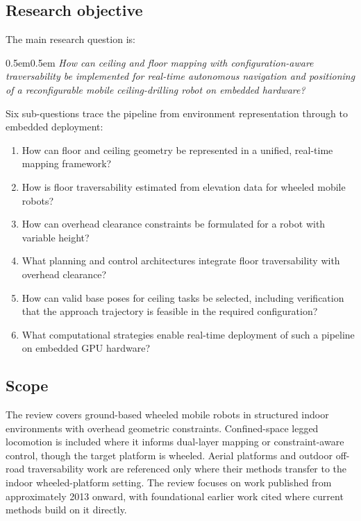 \documentclass[11pt,a4paper]{article}
\begin{document}
\subsection{Research objective}
\label{sec:research-objective}

The main research question is:


\begin{adjustwidth}{0.5em}{0.5em}
\itshape
How can ceiling and floor mapping with configuration-aware traversability be implemented for real-time autonomous navigation and positioning of a reconfigurable mobile ceiling-drilling robot on embedded hardware?
\end{adjustwidth}

\noindent Six sub-questions trace the pipeline from environment representation through to embedded deployment:

\begin{enumerate}[label=\textbf{SQ\arabic*}, leftmargin=2em, labelsep=0.5em, itemsep=0.2em, topsep=0.3em]
    \item How can floor and ceiling geometry be represented in a unified, real-time mapping framework?
    \item How is floor traversability estimated from elevation data for wheeled mobile robots?
    \item How can overhead clearance constraints be formulated for a robot with variable height?
    \item What planning and control architectures integrate floor traversability with overhead clearance?
    \item How can valid base poses for ceiling tasks be selected, including verification that the approach trajectory is feasible in the required configuration?
    \item What computational strategies enable real-time deployment of such a pipeline on embedded GPU hardware?
\end{enumerate}

\subsection{Scope}
\label{sec:scope}

The review covers ground-based wheeled mobile robots in structured indoor environments with overhead geometric constraints. Confined-space legged locomotion is included where it informs dual-layer mapping or constraint-aware control, though the target platform is wheeled. Aerial platforms and outdoor off-road traversability work are referenced only where their methods transfer to the indoor wheeled-platform setting. The review focuses on work published from approximately 2013 onward, with foundational earlier work cited where current methods build on it directly.
\end{document}
